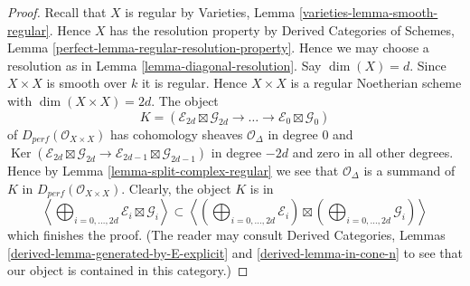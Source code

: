 \documentclass{stacks-project}
\theoremstyle{plain}
\theoremstyle{definition}
\theoremstyle{remark}
\numberwithin{equation}{subsection}
\def\Ker{\mathop{\mathrm{Ker}}}
\begin{document}
\begin{proof}
Recall that $X$ is regular by
Varieties, Lemma \ref{varieties-lemma-smooth-regular}.
Hence $X$ has the resolution property by
Derived Categories of Schemes, Lemma
\ref{perfect-lemma-regular-resolution-property}.
Hence we may choose a resolution as in Lemma \ref{lemma-diagonal-resolution}.
Say $\dim(X) = d$. Since $X \times X$ is smooth over $k$ it is regular.
Hence $X \times X$ is a regular Noetherian scheme with
$\dim(X \times X) = 2d$. The object
$$
K = (\mathcal{E}_{2d} \boxtimes \mathcal{G}_{2d} \to
\ldots \to
\mathcal{E}_0 \boxtimes \mathcal{G}_0)
$$
of $D_{perf}(\mathcal{O}_{X \times X})$
has cohomology sheaves $\mathcal{O}_\Delta$
in degree $0$ and $\Ker(\mathcal{E}_{2d} \boxtimes \mathcal{G}_{2d} \to
\mathcal{E}_{2d-1} \boxtimes \mathcal{G}_{2d-1})$ in degree $-2d$ and zero
in all other degrees.
Hence by Lemma \ref{lemma-split-complex-regular} we see that
$\mathcal{O}_\Delta$ is a summand of $K$ in
$D_{perf}(\mathcal{O}_{X \times X})$.
Clearly, the object $K$ is in
$$
\left\langle
\bigoplus\nolimits_{i = 0, \ldots, 2d} \mathcal{E}_i \boxtimes \mathcal{G}_i
\right\rangle
\subset
\left\langle
\left(\bigoplus\nolimits_{i = 0, \ldots, 2d} \mathcal{E}_i\right)
\boxtimes
\left(\bigoplus\nolimits_{i = 0, \ldots, 2d} \mathcal{G}_i\right)
\right\rangle
$$
which finishes the proof. (The reader may consult
Derived Categories, Lemmas \ref{derived-lemma-generated-by-E-explicit} and
\ref{derived-lemma-in-cone-n} to see that our object is contained in this
category.)
\end{proof}
\end{document}
